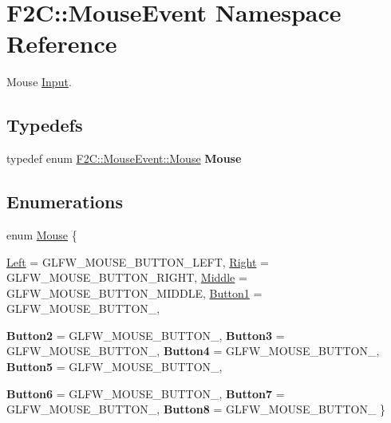\hypertarget{namespace_f2_c_1_1_mouse_event}{
\section{F2C::MouseEvent Namespace Reference}
\label{namespace_f2_c_1_1_mouse_event}
}


Mouse \hyperlink{class_f2_c_1_1_input}{Input}.  


\subsection*{Typedefs}
\begin{DoxyCompactItemize}
\item 
\hypertarget{namespace_f2_c_1_1_mouse_event_a5c91e69701f67f5e60a5648dbd3441d2}{
typedef enum \hyperlink{namespace_f2_c_1_1_mouse_event_ad51c859ddf42f97a3c31fb60c21821a8}{F2C::MouseEvent::Mouse} {\bfseries Mouse}}
\label{namespace_f2_c_1_1_mouse_event_a5c91e69701f67f5e60a5648dbd3441d2}

\end{DoxyCompactItemize}
\subsection*{Enumerations}
\begin{DoxyCompactItemize}
\item 
enum \hyperlink{namespace_f2_c_1_1_mouse_event_ad51c859ddf42f97a3c31fb60c21821a8}{Mouse} \{ \par
\hyperlink{namespace_f2_c_1_1_mouse_event_ad51c859ddf42f97a3c31fb60c21821a8a1808883a9ecc9dae87e1dd1c897b9686}{Left} =  GLFW\_\-MOUSE\_\-BUTTON\_\-LEFT, 
\hyperlink{namespace_f2_c_1_1_mouse_event_ad51c859ddf42f97a3c31fb60c21821a8af631815d2f2d0ff415970320fddaa856}{Right} =  GLFW\_\-MOUSE\_\-BUTTON\_\-RIGHT, 
\hyperlink{namespace_f2_c_1_1_mouse_event_ad51c859ddf42f97a3c31fb60c21821a8acd570ee5d756fe60904cbda093fead5f}{Middle} =  GLFW\_\-MOUSE\_\-BUTTON\_\-MIDDLE, 
\hyperlink{namespace_f2_c_1_1_mouse_event_ad51c859ddf42f97a3c31fb60c21821a8a0976f4119272f5d4f6333cb5e7204b87}{Button1} =  GLFW\_\-MOUSE\_\-BUTTON\_, 
\par
{\bfseries Button2} =  GLFW\_\-MOUSE\_\-BUTTON\_, 
{\bfseries Button3} =  GLFW\_\-MOUSE\_\-BUTTON\_, 
{\bfseries Button4} =  GLFW\_\-MOUSE\_\-BUTTON\_, 
{\bfseries Button5} =  GLFW\_\-MOUSE\_\-BUTTON\_, 
\par
{\bfseries Button6} =  GLFW\_\-MOUSE\_\-BUTTON\_, 
{\bfseries Button7} =  GLFW\_\-MOUSE\_\-BUTTON\_, 
{\bfseries Button8} =  GLFW\_\-MOUSE\_\-BUTTON\_
 \}
\end{DoxyCompactItemize}


